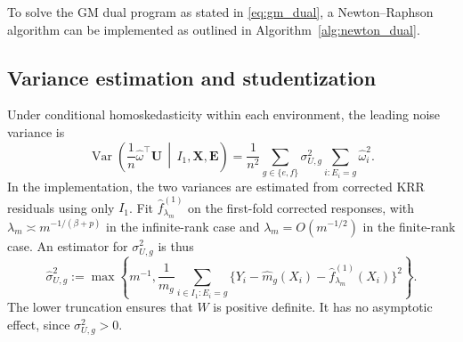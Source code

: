 \documentclass[11pt]{article}
\newcounter{ALGline}
\newlength{\ALGindent}
\newenvironment{algorithmic}[1][1]{%
    \setlength{\ALGindent}{0pt}%
    \begin{list}{\scriptsize\arabic{ALGline}:}{%
      \usecounter{ALGline}\setlength{\leftmargin}{2em}%
      \setlength{\labelwidth}{1.5em}\setlength{\labelsep}{.5em}%
      \setlength{\itemsep}{0pt}\setlength{\parsep}{0pt}}}{\end{list}}
\newcommand{\State}{\item\hspace*{\ALGindent}}
\newcommand{\Require}{\item[]\textbf{Require:} }
\newcommand{\Return}{\textbf{return}}
\newcommand{\If}[1]{\State\textbf{if} ##1 \textbf{then}\addtolength{\ALGindent}{1em}}
\newcommand{\EndIf}{\addtolength{\ALGindent}{-1em}\State\textbf{end if}}
\newcommand{\Repeat}{\State\textbf{repeat}\addtolength{\ALGindent}{1em}}
\newcommand{\Until}[1]{\addtolength{\ALGindent}{-1em}\State\textbf{until} ##1}
\begin{document}
To solve the GM dual program as stated in \eqref{eq:gm_dual}, a Newton--Raphson algorithm can be implemented as outlined in Algorithm~\ref{alg:newton_dual}.


\subsection{Variance estimation and studentization}
Under conditional homoskedasticity within each environment, the leading noise variance is
\begin{equation}
 \operatorname{Var}\!\left(\frac1n\widehat\omega^\top\bm U
 \,\middle|\,I_1,\bm X,\bm E\right)
 =\frac1{n^2}\sum_{g\in\{e,f\}}\sigma_{U,g}^2
      \sum_{i:E_i=g}\widehat\omega_i^2.
 \label{eq:conditional_variance}
\end{equation}
In the implementation, the two variances are estimated from corrected KRR residuals using only $I_1$. Fit $\widehat f_{\lambda_m}^{(1)}$ on the first-fold corrected responses, with $\lambda_m\asymp m^{-1/(\beta+p)}$ in the infinite-rank case and $\lambda_m=O(m^{-1/2})$ in the finite-rank case. An estimator for $\sigma_{U,g}^2$ is thus
\begin{equation}
 \widehat\sigma_{U,g}^2
 :=\max\left\{m^{-1},\frac1{m_g}\sum_{i\in I_1:E_i=g}
 \{Y_i-\widehat m_g(X_i)-\widehat f_{\lambda_m}^{(1)}(X_i)\}^2\right\}.
 \label{eq:sigma_hat}
\end{equation}
The lower truncation ensures that $W$ is positive definite. It has no asymptotic effect, since $\sigma_{U,g}^2>0$.
\end{document}
